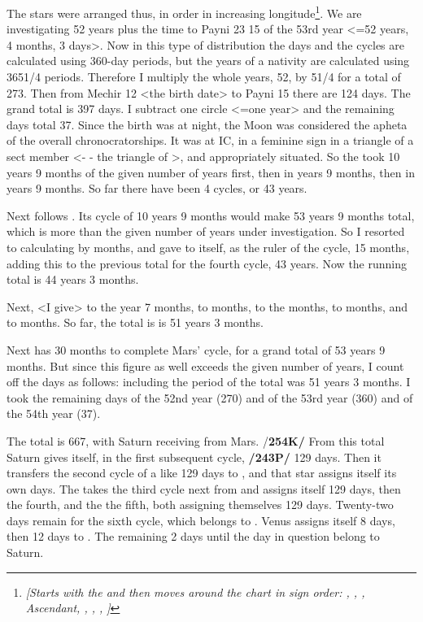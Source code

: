 The stars were arranged thus, in order in increasing longitude\footnote{\textit{[Starts with the \Moon\xspace and then moves around the chart in sign order: \Moon, \Venus, \Jupiter, Ascendant, \Saturn, \Mars, \Sun, \Mercury ]}}. We are investigating 52 years plus the time to Payni 23 15 of the 53rd year <=52 years, 4 months, 3 days>. Now in this type of distribution the days and the cycles are calculated using 360-day periods, but the years of a nativity are calculated using 3651/4 periods. Therefore I multiply the whole years, 52, by 51/4 for a total of 273. Then from Mechir 12 <the birth date> to Payni 15 there are 124 days. The grand total is 397 days. I subtract one circle <=one year> and the remaining days total 37. Since the birth was at night, the Moon was considered the apheta of the overall chronocratorships. It was at IC, in a feminine sign in a triangle of a sect member <\Pisces\xspace - \Cancer\xspace - \Scorpio  the triangle of \Venus>, and appropriately situated. So the \Moon\xspace took 10 years 9 months of the given number of years first, then \Venus\xspace in \Aries\xspace 10 years 9 months, then \Saturn\xspace in  years 9 months. So far there have been 4 cycles, or 43 years.

Next follows \Mars. Its cycle of 10 years 9 months would make 53 years 9 months total, which is more than the given number of years under investigation. So I resorted to calculating by months, and gave to \Mars\xspace itself, as the ruler of the cycle, 15 months, adding this to the previous total for the fourth cycle, 43 years. Now the running total is 44 years 3 months. 

Next, <I give> to the \Sun\xspace 1 year 7 months, to \Mercury\xspace 20 months, to the \Moon\xspace 25 months, to \Venus\xspace 8 months, and to \Jupiter\xspace 12 months. So far, the total is is 51 years 3 months. 

Next \Saturn\xspace has 30 months to complete Mars’ cycle, for a grand total of 53 years 9 months. But since this figure as well exceeds the given number of years, I count off the days as follows: including the period of \Jupiter\xspace the total was 51 years 3 months. I took the remaining days of the 52nd year (270) and of the 53rd year (360) and of the 54th year (37). 

The total is 667, with Saturn receiving from Mars. /\textbf{254K/} From this total Saturn gives itself, in the first subsequent cycle, \textbf{/243P/} 129 days. Then it transfers the second cycle of a like 129 days to \Mars, and that star assigns itself its own days. The \Sun\xspace takes the third cycle next from \Saturn\xspace and assigns itself 129 days, then \Mercury\xspace the fourth, and the \Moon\xspace the fifth, both assigning themselves 129 days. Twenty-two days remain for the sixth cycle, which belongs to \Venus. Venus assigns itself 8 days, then 12 days to \Jupiter. The remaining 2 days until the day in question belong to Saturn. 

